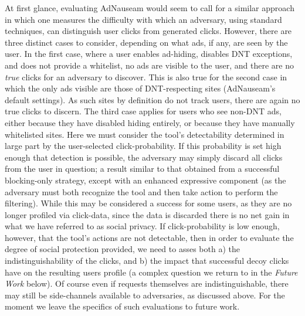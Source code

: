 \documentclass[conference]{IEEEtran}
\begin{document}
At first glance, evaluating AdNauseam would seem to call for a similar approach in which one measures the difficulty with which an adversary, using standard techniques, can distinguish user clicks from generated clicks. However, there are three distinct cases to consider, depending on what ads, if any, are seen by the user. In the first case, where a user enables ad-hiding, disables DNT exceptions, and does not provide a whitelist, no ads are visible to the user, and  there are no \emph{true} clicks for an adversary to discover. This is also true for the second case in which the only ads visible are those of DNT-respecting sites (AdNauseam's default settings). As such sites by definition do not track users, there are again no true clicks to discern. The third case applies for users who see non-DNT ads, either because they have disabled hiding entirely, or because they have manually whitelisted sites. Here we must consider the tool's detectability determined in large part by the user-selected click-probability. If this probability is set high enough that detection is possible, the adversary may simply discard all clicks from the user in question; a result similar to that obtained from a successful blocking-only strategy, except with an enhanced expressive component (as the adversary must both recognize the tool and then take action to perform the filtering). While this may be considered a success for some users, as they are no longer profiled via click-data, since the data is discarded there is no net gain in what we have referred to as social privacy. If click-probability is low enough, however, that the tool's actions are not detectable, then in order to evaluate the degree of social protection provided, we need to asses both a) the indistinguishability of the clicks, and b) the impact that successful decoy clicks have on the resulting users profile (a complex question we return to in the \emph{Future Work} below). Of course even if requests themselves are indistinguishable, there may still be side-channels available to adversaries, as discussed above. For the moment we leave the specifics of such evaluations to future work.
\end{document}
